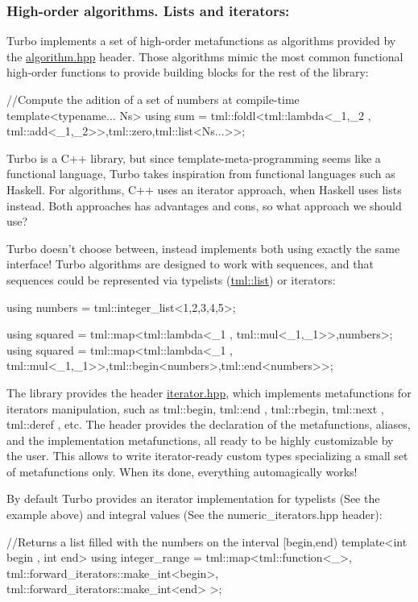 \subsubsection*{High-\/order algorithms. Lists and iterators\+:}

Turbo implements a set of high-\/order metafunctions as algorithms provided by the {\ttfamily \hyperlink{algorithm_8hpp_source}{algorithm.\+hpp}} header. Those algorithms mimic the most common functional high-\/order functions to provide building blocks for the rest of the library\+: \begin{DoxyVerb}//Compute the adition of a set of numbers at compile-time
template<typename... Ns>
using sum = tml::foldl<tml::lambda<_1,_2 , tml::add<_1,_2>>,tml::zero,tml::list<Ns...>>;
\end{DoxyVerb}


Turbo is a C++ library, but since template-\/meta-\/programming seems like a functional language, Turbo takes inspiration from functional languages such as Haskell. For algorithms, C++ uses an iterator approach, when Haskell uses lists instead. Both approaches has advantages and cons, so what approach we should use?

Turbo doesn't choose between, instead implements both using exactly the same interface! Turbo algorithms are designed to work with sequences, and that sequences could be represented via typelists ({\ttfamily \hyperlink{structtml_1_1list}{tml\+::list}}) or iterators\+: \begin{DoxyVerb}using numbers = tml::integer_list<1,2,3,4,5>;

using squared = tml::map<tml::lambda<_1 , tml::mul<_1,_1>>,numbers>;
using squared = tml::map<tml::lambda<_1 , tml::mul<_1,_1>>,tml::begin<numbers>,tml::end<numbers>>;
\end{DoxyVerb}


The library provides the header {\ttfamily \hyperlink{iterator_8hpp_source}{iterator.\+hpp}}, which implements metafunctions for iterators manipulation, such as {\ttfamily tml\+::begin}, {\ttfamily tml\+::end} , {\ttfamily tml\+::rbegin}, {\ttfamily tml\+::next} , {\ttfamily tml\+::deref} , etc. The header provides the declaration of the metafunctions, aliases, and the implementation metafunctions, all ready to be highly customizable by the user. This allows to write iterator-\/ready custom types specializing a small set of metafunctions only. When its done, everything automagically works!

By default Turbo provides an iterator implementation for typelists (See the example above) and integral values (See the {\ttfamily numeric\+\_\+iterators.\+hpp} header)\+: \begin{DoxyVerb}//Returns a list filled with the numbers on the interval [begin,end)
template<int begin , int end>
using integer_range = tml::map<tml::function<_>,
                               tml::forward_iterators::make_int<begin>,
                               tml::forward_iterators::make_int<end>
                              >;
\end{DoxyVerb}


